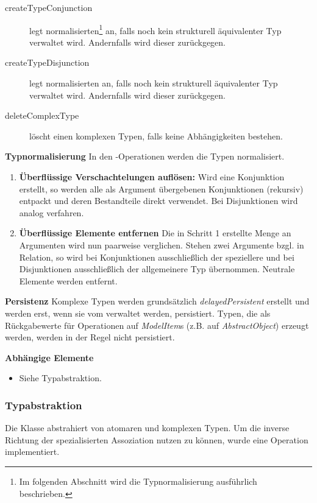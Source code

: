\begin{description}
\item[createTypeConjunction] legt normalisierten\footnote{Im folgenden Abschnitt wird die Typnormalisierung ausführlich beschrieben.}  an, falls noch kein strukturell äquivalenter Typ verwaltet wird. Andernfalls wird dieser zurückgegen.
\item[createTypeDisjunction] legt normalisierten  an, falls noch kein strukturell äquivalenter Typ verwaltet wird. Andernfalls wird dieser zurückgegen.
\item[deleteComplexType] löscht einen komplexen Typen, falls keine Abhängigkeiten bestehen.
\end{description}


\textbf{Typnormalisierung} \newline
In den -Operationen werden die Typen normalisiert. 
\begin{enumerate}
\item \textbf{Überflüssige Verschachtelungen auflösen:}  \newline 
	Wird eine Konjunktion erstellt, so werden alle als Argument übergebenen Konjunktionen (rekursiv) entpackt und deren Bestandteile direkt verwendet.
	Bei Disjunktionen wird analog verfahren. 
\item \textbf{Überflüssige Elemente entfernen}  \newline 
	Die in Schritt 1 erstellte Menge an Argumenten wird nun paarweise verglichen. Stehen zwei Argumente bzgl.  in Relation, so wird 
	bei Konjunktionen ausschließlich der speziellere und bei Disjunktionen ausschließlich der allgemeinere Typ übernommen. Neutrale Elemente werden 
	entfernt. 
\end{enumerate} 

\textbf{Persistenz} \newline
Komplexe Typen werden grundsätzlich \emph{delayedPersistent} erstellt und werden erst, wenn sie vom  verwaltet werden, persistiert. 
Typen, die als Rückgabewerte für Operationen auf \emph{ModelItem}s (z.B.  auf \emph{AbstractObject}) erzeugt werden, 
werden in der Regel nicht persistiert. 

\textbf{Abhängige Elemente}
\begin{itemize}
	\item Siehe Typabstraktion.
\end{itemize}

\subsubsection{Typabstraktion}
Die Klasse  abstrahiert von atomaren und komplexen Typen. Um die inverse Richtung der spezialisierten Assoziation 
 nutzen zu können, wurde eine Operation  implementiert. 

